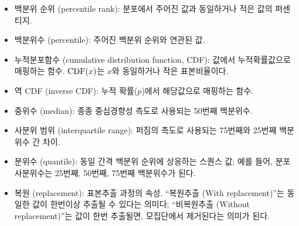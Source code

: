 \begin{itemize}

\item 백분위 순위 (percentile rank): 
분포에서 주어진 값과 동일하거나 적은 값의 퍼센티지.

\item 백분위수 (percentile): 주어진 백분위 순위와 연관된 값.

\item 누적분포함수 (cumulative distribution function, CDF): 
값에서 누적확률값으로 매핑하는 함수. $\mathrm{CDF}(x)$는 $x$와 동일하거나 작은 표본비율이다. 

\item 역 CDF (inverse CDF):
누적 확률($p$)에서 해당값으로 매핑하는 함수.

\item 중위수 (median): 
종종 중심경향성 측도로 사용되는 50번째 백분위수.

\item 사분위 범위 (interquartile range): 
퍼짐의 측도로 사용되는 75번째와 25번째 백분위수 간 차이.

\item 분위수 (quantile): 
동일 간격 백분위 순위에 상응하는 스퀀스 값; 예를 들어, 
분포 사분위수는 25번째, 50번째, 75번째 백분위수가 된다.

\item 복원 (replacement): 
표본추출 과정의 속성. ``복원추출 (With replacement)''는 동일한 값이 한번이상 추출될 수 있다는 의미다;
``비복원추출 (Without replacement)''는 값이 한번 추출될면, 모집단에서 제거된다는 의미가 된다.

\end{itemize}

